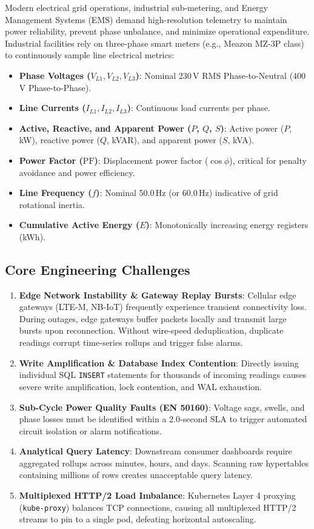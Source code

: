 \documentclass[11pt,a4paper]{article}
\begin{document}
Modern electrical grid operations, industrial sub-metering, and Energy Management Systems (EMS) demand high-resolution telemetry to maintain power reliability, prevent phase unbalance, and minimize operational expenditure. Industrial facilities rely on three-phase smart meters (e.g., Meazon MZ-3P class) to continuously sample line electrical metrics:
\begin{itemize}
    \item \textbf{Phase Voltages ($V_{L1}, V_{L2}, V_{L3}$)}: Nominal 230\,V RMS Phase-to-Neutral (400\,V Phase-to-Phase).
    \item \textbf{Line Currents ($I_{L1}, I_{L2}, I_{L3}$)}: Continuous load currents per phase.
    \item \textbf{Active, Reactive, and Apparent Power ($P$, $Q$, $S$)}: Active power ($P$, kW), reactive power ($Q$, kVAR), and apparent power ($S$, kVA).
    \item \textbf{Power Factor ($\text{PF}$)}: Displacement power factor ($\cos \phi$), critical for penalty avoidance and power efficiency.
    \item \textbf{Line Frequency ($f$)}: Nominal 50.0\,Hz (or 60.0\,Hz) indicative of grid rotational inertia.
    \item \textbf{Cumulative Active Energy ($E$)}: Monotonically increasing energy registers (kWh).
\end{itemize}

\subsection{Core Engineering Challenges}
\begin{enumerate}
    \item \textbf{Edge Network Instability \& Gateway Replay Bursts}: Cellular edge gateways (LTE-M, NB-IoT) frequently experience transient connectivity loss. During outages, edge gateways buffer packets locally and transmit large bursts upon reconnection. Without wire-speed deduplication, duplicate readings corrupt time-series rollups and trigger false alarms.
    \item \textbf{Write Amplification \& Database Index Contention}: Directly issuing individual SQL \texttt{INSERT} statements for thousands of incoming readings causes severe write amplification, lock contention, and WAL exhaustion.
    \item \textbf{Sub-Cycle Power Quality Faults (EN 50160)}: Voltage sags, swells, and phase losses must be identified within a 2.0-second SLA to trigger automated circuit isolation or alarm notifications.
    \item \textbf{Analytical Query Latency}: Downstream consumer dashboards require aggregated rollups across minutes, hours, and days. Scanning raw hypertables containing millions of rows creates unacceptable query latency.
    \item \textbf{Multiplexed HTTP/2 Load Imbalance}: Kubernetes Layer 4 proxying (\texttt{kube-proxy}) balances TCP connections, causing all multiplexed HTTP/2 streams to pin to a single pod, defeating horizontal autoscaling.
\end{enumerate}
\end{document}

